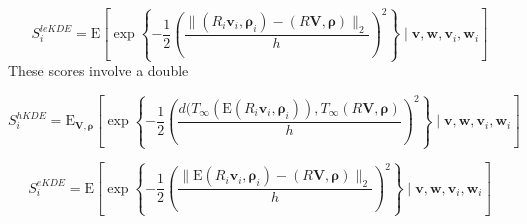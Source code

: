 \begin{equation}
    \label{eqn:ad_kde_mel}
    S_i^{leKDE} = \text{E}\left[
    \exp\left\lbrace
    -\frac{1}{2}\left(
    \frac{\lVert(R_i\bm{v}_i,\bm{\rho}_i) - (R\bm{V},\bm{\rho})\rVert_2}{h}
    \right)^2
    \right\rbrace
    \mid
    \bm{v},\bm{w},\bm{v}_i,\bm{w}_i
    \right]
\end{equation}
These scores involve a double 



\begin{equation}
    \label{eqn:ad_kde_mh}
    S_i^{hKDE} = \text{E}_{\bm{V},\bm{\rho}}\left[
    \exp\left\lbrace
    -\frac{1}{2}\left(
    \frac{d(T_{\infty}(\text{E}(R_i\bm{v}_i,\bm{\rho}_i)), T_{\infty}(R\bm{V},\bm{\rho})}{h}
    \right)^2
    \right\rbrace 
    \mid \bm{v},\bm{w},\bm{v}_i, \bm{w}_i\right]
\end{equation}

\begin{equation}
    \label{eqn:ad_kde_me}
    S_i^{eKDE} = \text{E}\left[
    \exp\left\lbrace
    -\frac{1}{2}\left(
    \frac{\lVert\text{E}(R_i\bm{v}_i,\bm{\rho}_i) - (R\bm{V},\bm{\rho})\rVert_2}{h}
    \right)^2
    \right\rbrace
    \mid
    \bm{v},\bm{w},\bm{v}_i,\bm{w}_i
    \right]
\end{equation}



